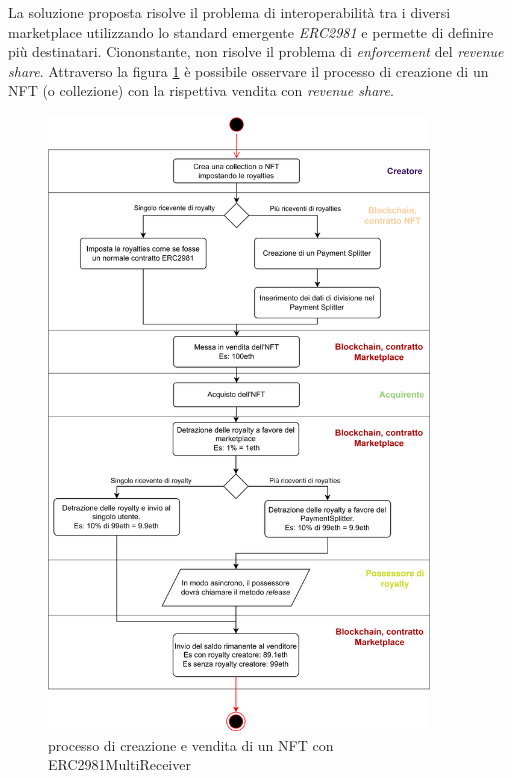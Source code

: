 La soluzione proposta risolve il problema di interoperabilità tra i diversi marketplace utilizzando lo standard emergente \textit{ERC2981} e permette di definire più destinatari. Ciononstante, non risolve il problema di \textit{enforcement} del \textit{revenue share}.
Attraverso la figura \ref{fig:creazioneVenditaNFTRoyaltyERC2981MultiReceiver} è possibile osservare il processo di creazione di un NFT (o collezione) con la rispettiva vendita con \textit{revenue share}.

\begin{figure}[H]
    \centering
    \includegraphics[width=0.9\textwidth]{images/creazioneVenditaNFTRoyaltyERC2981MultiReceiver.png}
    \caption{processo di creazione e vendita di un NFT con ERC2981MultiReceiver}
    \label{fig:creazioneVenditaNFTRoyaltyERC2981MultiReceiver}
\end{figure}


